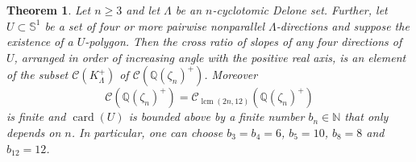 \documentclass[a4paper]{amsart}
\newtheorem{theorem}{Theorem}[section]
\theoremstyle{definition}
\numberwithin{equation}{section}
\numberwithin{theorem}{section}
\begin{document}
\begin{theorem}\label{finitesetncr0gen}
Let $n\geq 3$ and let $\varLambda$ be an $n$-cyclotomic Delone set. Further, let $U\subset\mathbb{S}^1$ be a set of four or more pairwise
nonparallel $\varLambda$-directions and suppose the existence of a
$U$-polygon. Then the
cross ratio of slopes of any four directions of $U$, arranged in order
of increasing angle with the positive real axis, is an element of the subset
$\mathcal{C}(K_{\varLambda}^+)$ of\/
$
\mathcal{C}({\mathbb{Q}}(\zeta_n)^+)
$.  Moreover
$$\mathcal{C}({\mathbb{Q}}(\zeta_n)^+)=\mathcal{C}_{\operatorname{lcm}(2n,12)}({\mathbb{Q}}(\zeta_n)^+)$$
is finite 
and $\operatorname{card}(U)$ is bounded above by a finite number
$b_n\in{\mathbb{N}}$ that only depends on $n$. In particular, one can choose
$b_3=b_4=6$, $b_5=10$, $b_8=8$ and $b_{12}=12$. 
\end{theorem}
\end{document}
